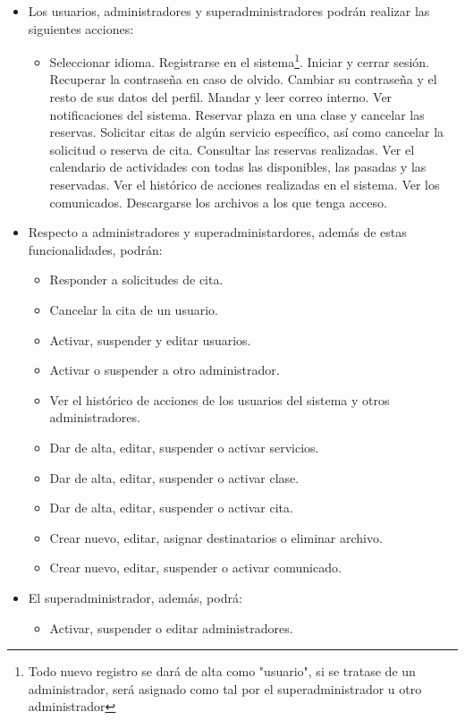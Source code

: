 \begin{itemize}
\item Los usuarios, administradores y superadministradores podrán realizar las siguientes acciones: 

\begin{itemize}
\item Seleccionar idioma.
\tiem Registrarse en el sistema\footnote{Todo nuevo registro se dará de alta como "usuario", si se tratase de un administrador, será asignado como tal por el superadministrador u otro administrador}.
\tiem Iniciar y cerrar sesión.
\tiem Recuperar la contraseña en caso de olvido.
\tiem Cambiar su contraseña y el resto de sus datos del perfil.
\tiem Mandar y leer correo interno.
\tiem Ver notificaciones del sistema.
\tiem Reservar plaza en una clase y cancelar las reservas.
\tiem Solicitar citas de algún servicio específico, así como cancelar la solicitud o reserva de cita.
\tiem Consultar las reservas realizadas.
\tiem Ver el calendario de actividades con todas las disponibles, las pasadas y las reservadas.
\tiem Ver el histórico de acciones realizadas en el sistema.
\tiem Ver los comunicados.
\tiem Descargarse los archivos a los que tenga acceso. 
\end{itemize}

\item Respecto a administradores y superadministardores, además de estas funcionalidades, podrán: 

\begin{itemize}
\item Responder a solicitudes de cita.
\item Cancelar la cita de un usuario.
\item Activar, suspender y editar usuarios.
\item Activar o suspender a otro administrador.
\item Ver el histórico de acciones de los usuarios del sistema y otros administradores.
\item Dar de alta, editar, suspender o activar servicios.
\item Dar de alta, editar, suspender o activar clase.
\item Dar de alta, editar, suspender o activar cita.
\item Crear nuevo, editar, asignar destinatarios o eliminar archivo.
\item Crear nuevo, editar, suspender o activar comunicado.
\end{itemize}

\item El superadministrador, además, podrá:

\begin{itemize}
\item Activar, suspender o editar administradores.
\end{itemize}

\end{itemize}


